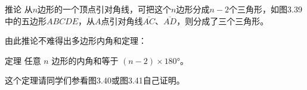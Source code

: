 \begin{figure}
    \begin{minipage}[t]{0.48\linewidth}
    \centering
\begin{tikzpicture}[>=latex, scale=1]
    \end{tikzpicture}
    \caption{}
    \end{minipage}
    \end{figure}

\begin{Deduction}{推论}
从$n$边形的一个顶点引对角线，可把这个$n$边形分成$n-2$个三角形，如图3.39中的五边形$ABCDE$，从$A$点引对角线$\overline{AC}$、$\overline{AD}$，则分成了三个三角形。
\end{Deduction}

由此推论不难得出多边形内角和定理：

\begin{Theorem}[多边形内角和定理]{定理}
任意 $n$ 边形的内角和等于 $(n-2)\times \ang{180}$。 
\end{Theorem}

这个定理请同学们参看图3.40或图3.41自己证明。

